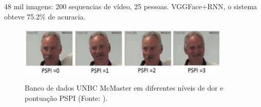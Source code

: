 \begin{frame}
    \frametitle{} 
    48 mil imagens: 200 sequencias de vídeo, 25 pessoas. 
VGGFace+RNN, o sistema obteve 75.2\% de acuracia.
    \begin{figure}[!ht]
    \centering
    \caption{Banco de dados UNBC McMaster em diferentes níveis de 
    dor e pontuação PSPI (Fonte: \textcite{bargshady2019joint}).}
      \includegraphics[width=0.9\textwidth]{images/bargshady2019joint.png}
    \label{fig:bargshady2019joint}
  \end{figure}
\end{frame}


